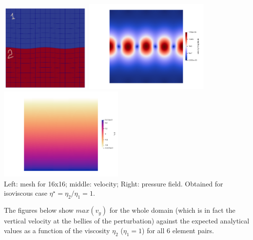 \begin{center}
\includegraphics[width=4.5cm]{python_codes/fieldstone_120/images/rt_setup}
\includegraphics[width=6.2cm]{python_codes/fieldstone_120/images/rt_vel}
\includegraphics[width=6.2cm]{python_codes/fieldstone_120/images/rt_press}\\
{\captionfont Left: mesh for 16x16; middle: velocity; Right: pressure field.
Obtained for isoviscous case $\eta^\star=\eta_2/\eta_1=1$.}
\end{center}

\newpage
The figures below show $max(v_y)$ for the whole domain (which is in fact the vertical velocity 
at the bellies of the perturbation) against the expected analytical values as a function 
of the viscosity $\eta_2$ ($\eta_1=1$) for all 6 element pairs.

